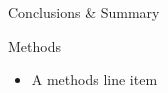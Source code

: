 \documentclass[final]{beamer}
\begin{document}
\begin{frame}{}
\begin{columns}[t]
\begin{column}{0.32\linewidth}
      \begin{block}{Conclusions \& Summary}
	  	\begin{figure}
		\end{figure}
      \end{block}

      \begin{block}{Methods}
		\begin{small}
	  	\begin{itemize}
			 \item A methods line item
		\end{itemize}
		\end{small}
      \end{block}

    \end{column}%

  \end{columns}
\end{frame}
\end{document}
